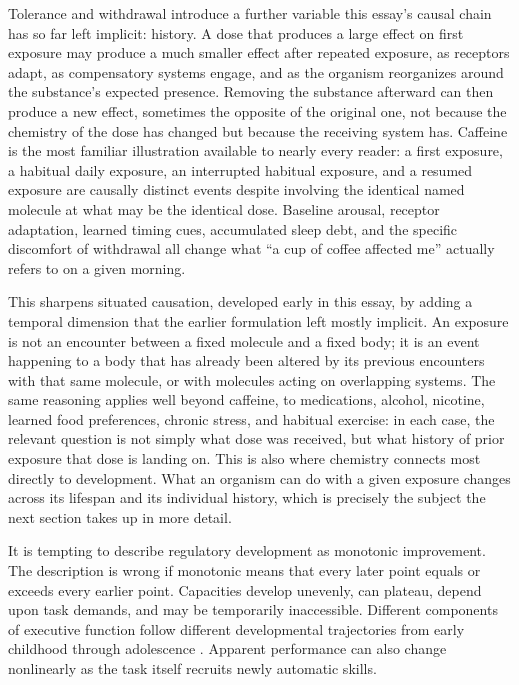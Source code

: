 \documentclass[11pt]{article}
\begin{document}
Tolerance and withdrawal introduce a further variable this essay's causal chain has so far left implicit: history. A dose that produces a large effect on first exposure may produce a much smaller effect after repeated exposure, as receptors adapt, as compensatory systems engage, and as the organism reorganizes around the substance's expected presence. Removing the substance afterward can then produce a new effect, sometimes the opposite of the original one, not because the chemistry of the dose has changed but because the receiving system has. Caffeine is the most familiar illustration available to nearly every reader: a first exposure, a habitual daily exposure, an interrupted habitual exposure, and a resumed exposure are causally distinct events despite involving the identical named molecule at what may be the identical dose. Baseline arousal, receptor adaptation, learned timing cues, accumulated sleep debt, and the specific discomfort of withdrawal all change what ``a cup of coffee affected me'' actually refers to on a given morning.

This sharpens situated causation, developed early in this essay, by adding a temporal dimension that the earlier formulation left mostly implicit. An exposure is not an encounter between a fixed molecule and a fixed body; it is an event happening to a body that has already been altered by its previous encounters with that same molecule, or with molecules acting on overlapping systems. The same reasoning applies well beyond caffeine, to medications, alcohol, nicotine, learned food preferences, chronic stress, and habitual exercise: in each case, the relevant question is not simply what dose was received, but what history of prior exposure that dose is landing on. This is also where chemistry connects most directly to development. What an organism can do with a given exposure changes across its lifespan and its individual history, which is precisely the subject the next section takes up in more detail.

It is tempting to describe regulatory development as monotonic improvement. The description is wrong if monotonic means that every later point equals or exceeds every earlier point. Capacities develop unevenly, can plateau, depend upon task demands, and may be temporarily inaccessible. Different components of executive function follow different developmental trajectories from early childhood through adolescence 
\citep{best2010developmental}. Apparent performance can also change nonlinearly as the task itself recruits newly automatic skills.
\end{document}
